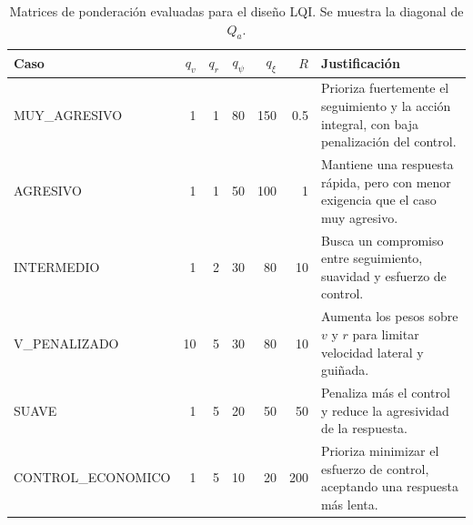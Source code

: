 \begin{table}[H]
\centering
\caption{Matrices de ponderación evaluadas para el diseño LQI. Se muestra la diagonal de $Q_a$.}
\label{tab:parte-c-ponderaciones}
\scriptsize
\setlength{\tabcolsep}{3pt}
\begin{tabularx}{\textwidth}{lrrrrr>{\raggedright\arraybackslash}X}
\toprule
Caso & $q_v$ & $q_r$ & $q_\psi$ & $q_\xi$ & $R$ & Justificación \\
\midrule
MUY\_AGRESIVO & 1 & 1 & 80 & 150 & 0.5 & Prioriza fuertemente el seguimiento y la acción integral, con baja penalización del control. \\
AGRESIVO & 1 & 1 & 50 & 100 & 1 & Mantiene una respuesta rápida, pero con menor exigencia que el caso muy agresivo. \\
INTERMEDIO & 1 & 2 & 30 & 80 & 10 & Busca un compromiso entre seguimiento, suavidad y esfuerzo de control. \\
V\_PENALIZADO & 10 & 5 & 30 & 80 & 10 & Aumenta los pesos sobre $v$ y $r$ para limitar velocidad lateral y guiñada. \\
SUAVE & 1 & 5 & 20 & 50 & 50 & Penaliza más el control y reduce la agresividad de la respuesta. \\
CONTROL\_ECONOMICO & 1 & 5 & 10 & 20 & 200 & Prioriza minimizar el esfuerzo de control, aceptando una respuesta más lenta. \\
\bottomrule
\end{tabularx}
\end{table}
